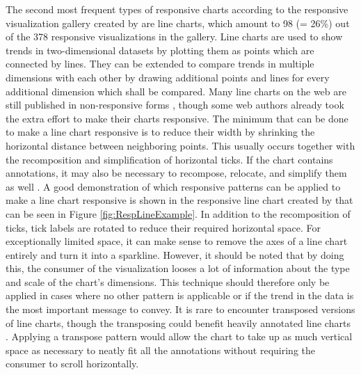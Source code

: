 The second most frequent types of responsive charts according to the responsive visualization gallery created by \cite{DesignPatternsTradeOffsRespVis} are line charts, which amount to 98 (= 26\%) out of the 378 responsive visualizations in the gallery. Line charts are used to show trends in two-dimensional datasets by plotting them as points which are connected by lines. They can be extended to compare trends in multiple dimensions with each other by drawing additional points and lines for every additional dimension which shall be compared. Many line charts on the web are still published in non-responsive forms \parencite{HLine,HLine2}, though some web authors already took the extra effort to make their charts responsive. The minimum that can be done to make a line chart responsive is to reduce their width \parencite{RespRadialScatterHLine} by shrinking the horizontal distance between neighboring points. This usually occurs together with the recomposition and simplification of horizontal ticks. If the chart contains annotations, it may also be necessary to recompose, relocate, and simplify them as well \parencite{RespHLines,RespHLine,RespHBarHLine,RespHLineHStackedBar}. A good demonstration of which responsive patterns can be applied to make a line chart responsive is shown in the responsive line chart created by \cite{RespVis} that can be seen in Figure \ref{fig:RespLineExample}. In addition to the recomposition of ticks, tick labels are rotated to reduce their required horizontal space. For exceptionally limited space, it can make sense to remove the axes of a line chart entirely and turn it into a sparkline. However, it should be noted that by doing this, the consumer of the visualization looses a lot of information about the type and scale of the chart's dimensions. This technique should therefore only be applied in cases where no other pattern is applicable or if the trend in the data is the most important message to convey. It is rare to encounter transposed versions of line charts, though the transposing could benefit heavily annotated line charts \parencite{VLine}. Applying a transpose pattern would allow the chart to take up as much vertical space as necessary to neatly fit all the annotations without requiring the consumer to scroll horizontally.

